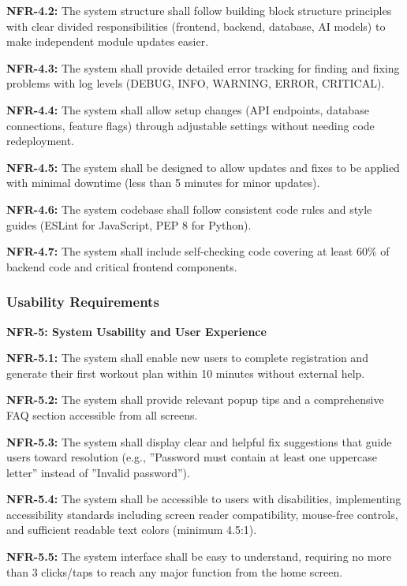 \documentclass[12pt,a4paper]{article}
\begin{document}
\textbf{NFR-4.2:} The system structure shall follow building block structure principles with clear divided responsibilities (frontend, backend, database, AI models) to make independent module updates easier.

\textbf{NFR-4.3:} The system shall provide detailed error tracking for finding and fixing problems with log levels (DEBUG, INFO, WARNING, ERROR, CRITICAL).

\textbf{NFR-4.4:} The system shall allow setup changes (API endpoints, database connections, feature flags) through adjustable settings without needing code redeployment.

\textbf{NFR-4.5:} The system shall be designed to allow updates and fixes to be applied with minimal downtime (less than 5 minutes for minor updates).

\textbf{NFR-4.6:} The system codebase shall follow consistent code rules and style guides (ESLint for JavaScript, PEP 8 for Python).

\textbf{NFR-4.7:} The system shall include self-checking code covering at least 60\% of backend code and critical frontend components.

\subsubsection{Usability Requirements}

\textbf{NFR-5: System Usability and User Experience}

\textbf{NFR-5.1:} The system shall enable new users to complete registration and generate their first workout plan within 10 minutes without external help.

\textbf{NFR-5.2:} The system shall provide relevant popup tips and a comprehensive FAQ section accessible from all screens.

\textbf{NFR-5.3:} The system shall display clear and helpful fix suggestions that guide users toward resolution (e.g., ”Password must contain at least one uppercase letter” instead of ”Invalid password”).

\textbf{NFR-5.4:} The system shall be accessible to users with disabilities, implementing accessibility standards including screen reader compatibility, mouse-free controls, and sufficient readable text colors (minimum 4.5:1).

\textbf{NFR-5.5:} The system interface shall be easy to understand, requiring no more than 3 clicks/taps to reach any major function from the home screen.
\end{document}
